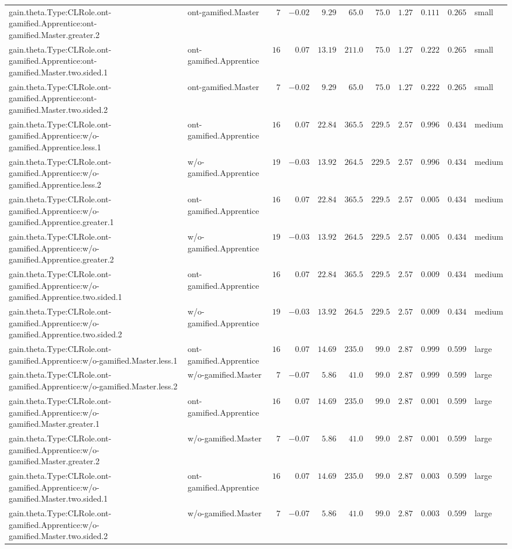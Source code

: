\documentclass[6pt]{article}
\begin{document}
\begin{landscape}
{\begin{longtable}{llrrrrrrrrl}
gain.theta.Type:CLRole.ont-gamified.Apprentice:ont-gamified.Master.greater.2&ont-gamified.Master&$ 7$&$-0.02$&$ 9.29$&$ 65.0$&$ 75.0$&$ 1.27$&$0.111$&$0.265$&small\tabularnewline
gain.theta.Type:CLRole.ont-gamified.Apprentice:ont-gamified.Master.two.sided.1&ont-gamified.Apprentice&$16$&$ 0.07$&$13.19$&$211.0$&$ 75.0$&$ 1.27$&$0.222$&$0.265$&small\tabularnewline
gain.theta.Type:CLRole.ont-gamified.Apprentice:ont-gamified.Master.two.sided.2&ont-gamified.Master&$ 7$&$-0.02$&$ 9.29$&$ 65.0$&$ 75.0$&$ 1.27$&$0.222$&$0.265$&small\tabularnewline
gain.theta.Type:CLRole.ont-gamified.Apprentice:w/o-gamified.Apprentice.less.1&ont-gamified.Apprentice&$16$&$ 0.07$&$22.84$&$365.5$&$229.5$&$ 2.57$&$0.996$&$0.434$&medium\tabularnewline
gain.theta.Type:CLRole.ont-gamified.Apprentice:w/o-gamified.Apprentice.less.2&w/o-gamified.Apprentice&$19$&$-0.03$&$13.92$&$264.5$&$229.5$&$ 2.57$&$0.996$&$0.434$&medium\tabularnewline
gain.theta.Type:CLRole.ont-gamified.Apprentice:w/o-gamified.Apprentice.greater.1&ont-gamified.Apprentice&$16$&$ 0.07$&$22.84$&$365.5$&$229.5$&$ 2.57$&$0.005$&$0.434$&medium\tabularnewline
gain.theta.Type:CLRole.ont-gamified.Apprentice:w/o-gamified.Apprentice.greater.2&w/o-gamified.Apprentice&$19$&$-0.03$&$13.92$&$264.5$&$229.5$&$ 2.57$&$0.005$&$0.434$&medium\tabularnewline
gain.theta.Type:CLRole.ont-gamified.Apprentice:w/o-gamified.Apprentice.two.sided.1&ont-gamified.Apprentice&$16$&$ 0.07$&$22.84$&$365.5$&$229.5$&$ 2.57$&$0.009$&$0.434$&medium\tabularnewline
gain.theta.Type:CLRole.ont-gamified.Apprentice:w/o-gamified.Apprentice.two.sided.2&w/o-gamified.Apprentice&$19$&$-0.03$&$13.92$&$264.5$&$229.5$&$ 2.57$&$0.009$&$0.434$&medium\tabularnewline
gain.theta.Type:CLRole.ont-gamified.Apprentice:w/o-gamified.Master.less.1&ont-gamified.Apprentice&$16$&$ 0.07$&$14.69$&$235.0$&$ 99.0$&$ 2.87$&$0.999$&$0.599$&large\tabularnewline
gain.theta.Type:CLRole.ont-gamified.Apprentice:w/o-gamified.Master.less.2&w/o-gamified.Master&$ 7$&$-0.07$&$ 5.86$&$ 41.0$&$ 99.0$&$ 2.87$&$0.999$&$0.599$&large\tabularnewline
gain.theta.Type:CLRole.ont-gamified.Apprentice:w/o-gamified.Master.greater.1&ont-gamified.Apprentice&$16$&$ 0.07$&$14.69$&$235.0$&$ 99.0$&$ 2.87$&$0.001$&$0.599$&large\tabularnewline
gain.theta.Type:CLRole.ont-gamified.Apprentice:w/o-gamified.Master.greater.2&w/o-gamified.Master&$ 7$&$-0.07$&$ 5.86$&$ 41.0$&$ 99.0$&$ 2.87$&$0.001$&$0.599$&large\tabularnewline
gain.theta.Type:CLRole.ont-gamified.Apprentice:w/o-gamified.Master.two.sided.1&ont-gamified.Apprentice&$16$&$ 0.07$&$14.69$&$235.0$&$ 99.0$&$ 2.87$&$0.003$&$0.599$&large\tabularnewline
gain.theta.Type:CLRole.ont-gamified.Apprentice:w/o-gamified.Master.two.sided.2&w/o-gamified.Master&$ 7$&$-0.07$&$ 5.86$&$ 41.0$&$ 99.0$&$ 2.87$&$0.003$&$0.599$&large\tabularnewline

\end{longtable}}
\end{landscape}
\end{document}
